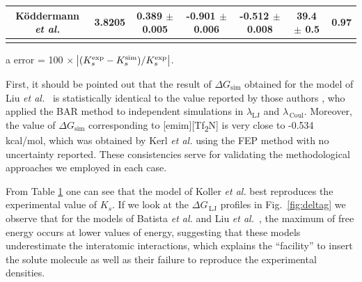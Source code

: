 \documentclass[3p,twocolumn]{elsarticle}
\begin{document}
\begin{table}
\begin{adjustbox}{width=1\textwidth}
\begin{threeparttable}
\begin{tabular}{ c c c  c  c  c  c }
		\hline
 K\"{o}ddermann \textit{et al.} \cite{K_ddermann_2007} &3.8205 & 0.389 $\pm$ 0.005 & -0.901 $\pm$ 0.006& -0.512 $\pm$ 0.008 & 39.4 $\pm$ 0.5  & 0.97  \\
 \bottomrule
\label{table:henry} 
\end{tabular}
\begin{tablenotes}
\item[a] error = 100 $\times$ $\abs{(K_s^{\text{exp}} - K_s^{\text{sim}})/K_s^{\text{exp}}}$.
\end{tablenotes}
\end{threeparttable}
\end{adjustbox}
\end{table}

First, it should be pointed out that the result of $\Delta G_{\text{sim}}$ obtained for the model of Liu \textit{et al.}~\cite{Liu_2014} is statistically identical to the value reported by those authors \cite{Liu_2014_1}, who applied the BAR method \cite{Bennett_1976} to independent simulations in $\lambda_{\text{LJ}}$ and $\lambda_{\, \text{Coul}}$. Moreover, the value of $\Delta G_{\text{sim}}$ corresponding to [emim][Tf\textsubscript{2}N] is very close to -0.534 kcal/mol, which was obtained by Kerl \textit{et al.} \cite{Kerl__2017} using the FEP method \cite{Zwanzig_1954} with no uncertainty reported. These consistencies serve for validating the methodological approaches we employed in each case.

From Table \ref{table:henry} one can see that the model of Koller \textit{et al.} \cite{Koller_2012} best reproduces the experimental value of $K_s$. If we look at the $\Delta G_{\, \text{LJ}}$ profiles in Fig.~\ref{fig:deltag} we observe that for the models of Batista \textit{et al.} \cite{Batista_2015} and Liu \textit{et al.}~\cite{Liu_2014}, the maximum of free energy occurs at lower values of energy, suggesting that these models underestimate the interatomic interactions, which explains the ``facility'' to insert the solute molecule as well as their failure to reproduce the experimental densities.
\end{document}
